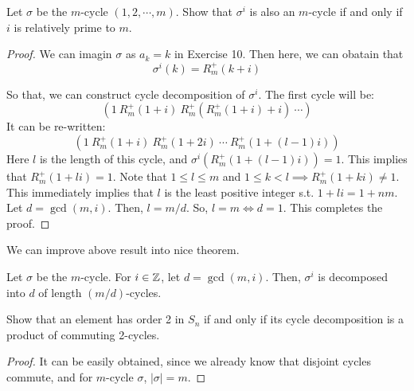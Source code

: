 \documentclass[12pt, a4paper, openany, twoside]{book}
\theoremstyle{definition}
\theoremstyle{remark}
\theoremstyle{plain}
\numberwithin{equation}{section}
\begin{document}
\begin{tcolorbox}[colback=yellow!10!white,colframe=violet!75!white,title=Exercise 11,breakable]

Let $\sigma$ be the $m$-cycle $(1, 2, \cdots, m)$. Show that $\sigma^i$ is also an $m$-cycle if and only if $i$ is relatively prime to $m$. 

\begin{proof}
    
We can imagin $\sigma$ as $a_k = k$ in Exercise 10. Then here, we can obatain that 
\[\sigma^i(k) = R^+_m(k + i)\]

So that, we can construct cycle decomposition of $\sigma^i$. The first cycle will be: 
\[(1~R^+_m(1 + i)~R^+_m(R^+_m(1 + i) + i)~\cdots )\]
It can be re-written: 
\[(1~R^+_m(1 + i)~R^+_m(1 + 2i)~\cdots~R^+_m(1 + (l-1)i))\]
Here $l$ is the length of this cycle, and $\sigma^i(R^+_m(1 + (l-1)i)) = 1$. 
This implies that $R^+_m(1 + li) = 1$. Note that $1 \leq l \leq m$ and $1 \leq k < l \implies R^+_m(1 + ki) \neq 1$. 
This immediately implies that $l$ is the least positive integer s.t. $1 + li = 1 + nm$. 
Let $d = \gcd(m, i)$. Then, $l = m/d$. So, $l = m \iff d = 1$. This completes the proof.

\end{proof}

\end{tcolorbox}

We can improve above result into nice theorem. 

\begin{tcolorbox}[colback=yellow!10!white,colframe=red!75!black,title=Corollary: i-th power of cycle]

Let $\sigma$ be the $m$-cycle. For $i \in {\mathbb {Z}}$, let $d = \gcd(m, i)$. Then, $\sigma^i$ is decomposed into 
$d$ of length $(m/d)$-cycles. 

\end{tcolorbox}

\begin{tcolorbox}[colback=yellow!10!white,colframe=violet!75!white,title=Exercise 13,breakable]

Show that an element has order 2 in $S_n$ if and only if its cycle decomposition is a product of commuting 2-cycles. 

\begin{proof}
    It can be easily obtained, since we already know that 
    disjoint cycles commute, and for $m$-cycle $\sigma$, $|\sigma| = m$. 
\end{proof}

\end{tcolorbox}
\end{document}
